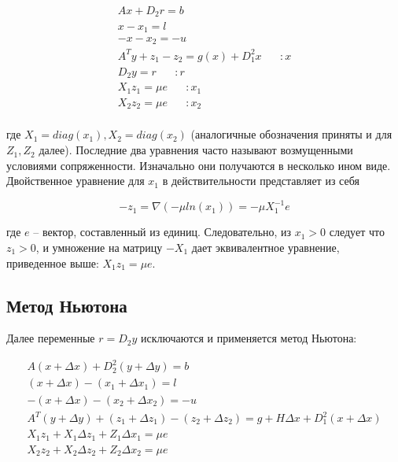 \documentclass[a4paper, 12pt, titlepage]{article}
\theoremstyle{definition}
\theoremstyle{plain}
\theoremstyle{plain}
\begin{document}
\begin{equation}
 \begin{aligned}
  A x + D_{2} r = b \\
  x - x_{1} = l \\
  -x - x_{2} = -u \\
  A^{T} y + z_{1} - z_{2} = g(x) + D_{1}^{2} x \;\;\;\;\;\; :x \\
  D_{2} y = r \;\;\;\;\;\; :r \\
  X_{1} z_{1} = \mu e \;\;\;\;\;\; :x_{1} \\
  X_{2} z_{2} = \mu e \;\;\;\;\;\; :x_{2} \\
 \end{aligned}
\end{equation}

где $X_{1} = diag(x_{1}), X_{2} = diag(x_{2})$ (аналогичные обозначения приняты
и для $Z_{1}, Z_{2}$ далее). Последние два уравнения часто называют
возмущенными условиями сопряженности. Изначально они получаются в несколько
ином виде. Двойственное уравнение для $x_{1}$ в действительности представляет
из себя

\begin{equation}
 -z_{1} = \nabla(-\mu ln(x_{1})) = -\mu X_{1}^{-1} e
\end{equation}

где $e$ -- вектор, составленный из единиц. Следовательно, из $x_{1} > 0$
следует что $z_{1} > 0$, и умножение на матрицу $-X_{1}$ дает эквивалентное
уравнение, приведенное выше: $X_{1} z_{1} = \mu e$.

\subsection{Метод Ньютона}

Далее переменные $r = D_{2} y$ исключаются и применяется метод Ньютона:

\begin{equation}
 \begin{aligned}
  A(x + \Delta x) + D_{2}^{2} (y + \Delta y) = b \\
  (x + \Delta x) - (x_{1} + \Delta x_{1}) = l \\
  -(x + \Delta x) - (x_{2} + \Delta x_{2}) = -u \\
  A^{T} (y + \Delta y) + (z_{1} + \Delta z_{1}) - (z_{2} + \Delta z_{2}) =
  g + H \Delta x + D_{1}^{2} (x + \Delta x) \\
  X_{1} z_{1} + X_{1} \Delta z_{1} + Z_{1} \Delta x_{1} = \mu e \\
  X_{2} z_{2} + X_{2} \Delta z_{2} + Z_{2} \Delta x_{2} = \mu e \\
 \end{aligned}
\end{equation}
\end{document}
